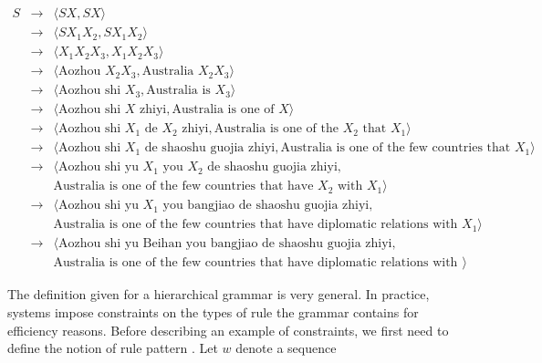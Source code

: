   \begin{footnotesize}
  \begin{eqnarray}
    S &\rightarrow& \langle S X, S X \rangle \nonumber \\
      &\rightarrow& \langle S X_1 X_2, S X_1 X_2 \rangle \nonumber \\
      &\rightarrow& \langle X_1 X_2 X_3, X_1 X_2 X_3 \rangle \nonumber \\
      &\rightarrow& \langle \mbox{Aozhou } X_2 X_3, \mbox{Australia } X_2 X_3 \rangle \nonumber \\
      &\rightarrow& \langle \mbox{Aozhou shi } X_3, \mbox{Australia is } X_3 \rangle \nonumber \\
      &\rightarrow& \langle \mbox{Aozhou shi } X \mbox{ zhiyi}, \mbox{Australia is one of } X \rangle \nonumber \\
      &\rightarrow& \langle \mbox{Aozhou shi } X_1 \mbox{ de } X_2 \mbox{ zhiyi}, \mbox{Australia is one of the } X_2 \mbox{ that } X_1 \rangle \nonumber \\
      &\rightarrow& \langle \mbox{Aozhou shi } X_1 \mbox{ de shaoshu guojia zhiyi}, \mbox{Australia is one of the few countries that } X_1 \rangle \nonumber \\
      &\rightarrow& \langle \mbox{Aozhou shi yu } X_1 \mbox{ you } X_2 \mbox{ de shaoshu guojia zhiyi}, \nonumber \\
      &&                    \mbox{Australia is one of the few countries that have } X_2 \mbox{ with } X_1 \rangle \nonumber \\
      &\rightarrow& \langle \mbox{Aozhou shi yu } X_1 \mbox{ you bangjiao de shaoshu guojia zhiyi}, \nonumber \\
      &&                    \mbox{Australia is one of the few countries that have diplomatic relations with } X_1 \rangle \nonumber \\
      &\rightarrow& \langle \mbox{Aozhou shi yu Beihan you bangjiao de shaoshu guojia zhiyi}, \nonumber \\ 
      &&                    \mbox{Australia is one of the few countries that have diplomatic relations with North Korea} \rangle \nonumber
  \end{eqnarray}
  \end{footnotesize}
%
  The definition given for a hierarchical grammar is very general. In practice, systems impose constraints on the types of rule the grammar contains
  for efficiency reasons.
  Before describing an example of constraints, we first need to define the notion of rule pattern \cite{iglesias-degispert-banga-byrne:2009:EACL}. Let $w$ denote a sequence
